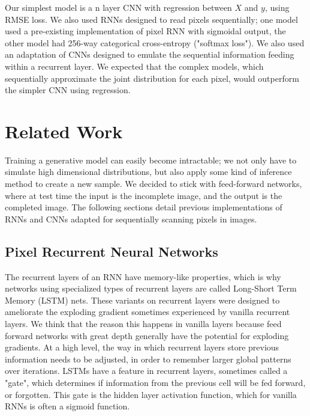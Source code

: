 \documentclass[10pt,twocolumn,letterpaper]{article}
\begin{document}
Our simplest model is a n layer CNN with regression between $X$ and $y$, using RMSE loss. We also used RNNs designed to read pixels sequentially; one model used a pre-existing implementation of pixel RNN with sigmoidal output, the other model had 256-way categorical cross-entropy ("softmax loss"). We also used an adaptation of CNNs designed to emulate the sequential information feeding within a recurrent layer. We expected that the complex models, which sequentially approximate the joint distribution for each pixel, would outperform the simpler CNN using regression.\\

\section{Related Work} 
Training a generative model can easily become intractable; we not only have to simulate high dimensional distributions, but also apply some kind of inference method to create a new sample. We decided to stick with feed-forward networks, where at test time the input is the incomplete image, and the output is the completed image. The following sections detail previous implementations of RNNs and CNNs adapted for sequentially scanning pixels in images.

\subsection{Pixel Recurrent Neural Networks}
The recurrent layers of an RNN have memory-like properties, which is why networks using specialized types of recurrent layers are called Long-Short Term Memory (LSTM) nets. These variants on recurrent layers were designed to ameliorate the exploding gradient sometimes experienced by vanilla recurrent layers. We think that the reason this happens in vanilla layers because feed forward networks with great depth generally have the potential for exploding gradients. At a high level, the way in which recurrent layers store previous information needs to be adjusted, in order to remember larger global patterns over iterations. LSTMs have a feature in recurrent layers, sometimes called a "gate", which determines if information from the previous cell will be fed forward, or forgotten. This gate is the hidden layer activation function, which for vanilla RNNs is often a sigmoid function. \cite{handwritingRNN}\\
\end{document}
